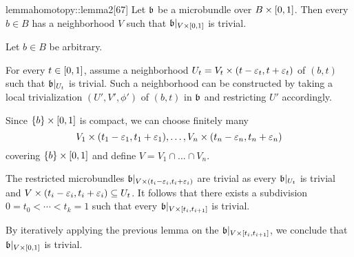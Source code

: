 \begin{mystatement}{lemma}{homotopy::lemma2}[67]
    Let $\bb$ be a microbundle over $B \times{} [0, 1]$.
    Then every $b \in B$ has a neighborhood $V$ such that $\bb[\cyl{V}]$ is trivial.
\end{mystatement}

\begin{myproof}
    Let $b \in B$ be arbitrary.

    For every $t \in [0, 1]$, assume a neighborhood
    $U_t = V_t \times (t - \varepsilon{}_t, t + \varepsilon{}_t)$ of $(b, t)$
    such that $\bb[U_t]$ is trivial.
    Such a neighborhood can be constructed by taking
    a local trivialization $(U', V', \phi')$ of $(b, t)$ in $\bb$
    and restricting $U'$ accordingly.

    Since $\{b\} \times{} [0, 1]$ is compact, we can choose finitely many
    \[ V_1 \times (t_1 - \varepsilon{}_1, t_1 + \varepsilon{}_1), \dots, V_n \times (t_n - \varepsilon{}_n, t_n + \varepsilon{}_n) \]
    covering $\{b\} \times [0, 1]$ and define $V = V_1 \cap \dots \cap V_n$.

    The restricted microbundles $\bb[V \cross (t_i - \eps_i, t_i + \eps_i)]$ are trivial
    as every $\bb[U_t]$ is trivial and $V \times (t_i - \varepsilon{}_i, t_i + \varepsilon{}_i) \subseteq{} U_t$.
    It follows that there exists a subdivision $0 = t_0 < \cdots < t_k = 1$ such that every $\bb[V \cross [t_{i}, t_{i + 1}]]$ is trivial.
    
    By iteratively applying the previous lemma on the $\bb[V \cross [t_i, t_{i + 1}]]$,
    we conclude that $\bb[\cyl{V}]$ is trivial.
\end{myproof}